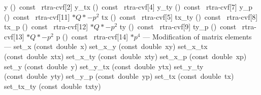\documentclass{article}
\begin{document}
\begin{cxxentry}
\begin{cxxclass}
\begin{cxxpublic}
\label{cxx.2.6.18}
        {y}
        {()\ const\ }
        { rtra-\>cvf[2]}
        {}
\label{cxx.2.6.19}
        {y\_tx}
        {()\ const\ }
        { rtra-\>cvf[4]}
        {}
\label{cxx.2.6.20}
        {y\_ty}
        {()\ const\ }
        { rtra-\>cvf[7]}
        {}
\label{cxx.2.6.21}
        {y\_p}
        {()\ const\ }
        { rtra-\>cvf[11] $* Q * -p^2$}
        {}
\label{cxx.2.6.22}
        {tx}
        {()\ const\ }
        { rtra-\>cvf[5]}
        {}
\label{cxx.2.6.23}
        {tx\_ty}
        {()\ const\ }
        { rtra-\>cvf[8]}
        {}
\label{cxx.2.6.24}
        {tx\_p}
        {()\ const\ }
        { rtra-\>cvf[12] $* Q * -p^2$}
        {}
\label{cxx.2.6.25}
        {ty}
        {()\ const\ }
        { rtra-\>cvf[9]}
        {}
\label{cxx.2.6.26}
        {ty\_p}
        {()\ const\ }
        { rtra-\>cvf[13] $* Q * -p^2$}
        {}
\label{cxx.2.6.27}
        {p}
        {()\ const\ }
        { rtra-\>cvf[14] $* p^4$}
        {}
\label{cxx.2.6.28}
\cxxitem{}
        {--- Modification of matrix elements --- }
        {}
        {}
        {}
\label{cxx.2.6.29}
        {set\_x}
        {(const\ double\ x)}
        {}
        {}
\label{cxx.2.6.30}
        {set\_x\_y}
        {(const\ double\ xy)}
        {										   }
        {}
\label{cxx.2.6.31}
        {set\_x\_tx}
        {(const\ double\ xtx)}
        {										   }
        {}
\label{cxx.2.6.32}
        {set\_x\_ty}
        {(const\ double\ xty)}
        {										   }
        {}
\label{cxx.2.6.33}
        {set\_x\_p}
        {(const\ double\ xp)}
        {										   }
        {}
\label{cxx.2.6.34}
        {set\_y}
        {(const\ double\ y)}
        {										   }
        {}
\label{cxx.2.6.35}
        {set\_y\_tx}
        {(const\ double\ ytx)}
        {										   }
        {}
\label{cxx.2.6.36}
        {set\_y\_ty}
        {(const\ double\ yty)}
        {										   }
        {}
\label{cxx.2.6.37}
        {set\_y\_p}
        {(const\ double\ yp)}
        {										   }
        {}
\label{cxx.2.6.38}
        {set\_tx}
        {(const\ double\ tx)}
        {										   }
        {}
\label{cxx.2.6.39}
        {set\_tx\_ty}
        {(const\ double\ txty)}
        {										   }
        {}
\label{cxx.2.6.40}

\end{cxxpublic}
\end{cxxclass}
\end{cxxentry}
\end{document}
